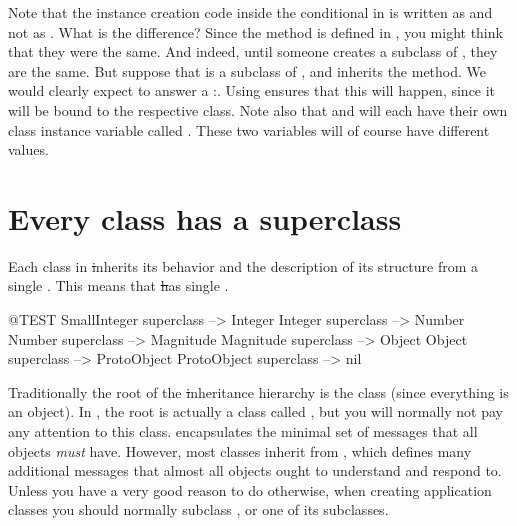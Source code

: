 \documentclass[a4paper,10pt,twoside]{book}
\begin{document}
Note that the instance creation code inside the conditional in  is written as  and not as .
What is the difference?   Since the  method is defined in , you might think that they were the same.    And indeed, until someone creates a subclass of , they are the same.  But suppose that  is a subclass of , and inherits the  method.  We would clearly expect  to answer a :. Using \self ensures that this will happen, since it will be bound to the respective class.
Note also that  and  will each have their own class instance variable called .  These two variables will of course have different values.

\section{Every class has a superclass}


Each class in \st inherits its behavior and the description of its structure from a single .
This means that \st has single .

\begin{code}{@TEST}
SmallInteger superclass --> Integer
Integer superclass          --> Number
Number superclass        --> Magnitude
Magnitude superclass    --> Object
Object superclass           --> ProtoObject
ProtoObject superclass  --> nil
\end{code}

Traditionally the root of the \st inheritance hierarchy is the class  (since everything is an object).
In \squeak, the root is actually a class called , but you will normally not pay any attention to this class.
 encapsulates the minimal set of messages that all objects \emph{must} have.  However, most classes inherit from , which defines many additional messages that almost all objects ought to understand and respond to.
Unless you have a very good reason to do otherwise, when creating application classes you should normally subclass , or one of its subclasses.

\end{document}

